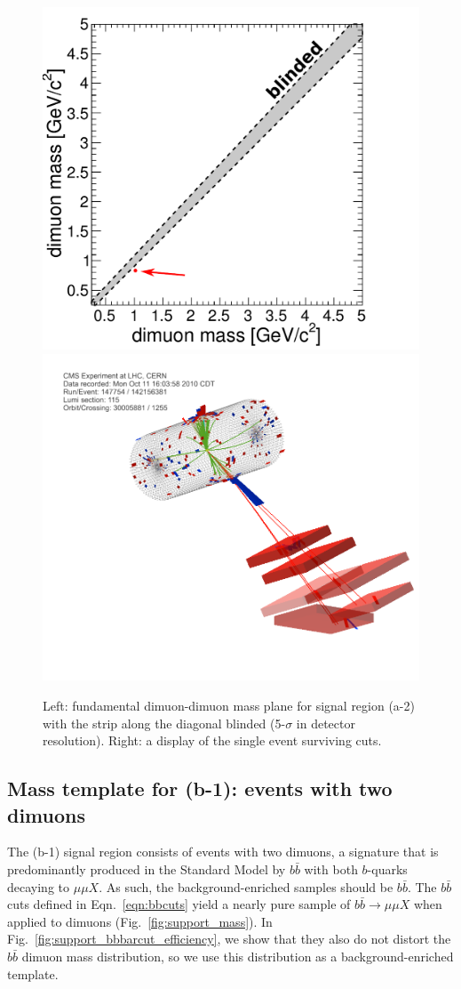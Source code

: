 \documentclass[12pt]{cms-tdr}
\begin{document}
\begin{figure}
\begin{center}
\includegraphics[height=6.5 cm]{PLOTS/data_quadmu_wholecontrol.pdf} \hspace{0.5 cm}
\includegraphics[height=6.5 cm]{PLOTS/quadmu_control_eventdisplay.png}
\end{center}

\caption{Left: fundamental dimuon-dimuon mass plane for signal region
  (a-2) with the strip along the diagonal blinded (5-$\sigma$ in
  detector resolution).  Right: a display of the single event
  surviving cuts. \label{fig:quadmu_wholecontrol}}
\end{figure}

\subsection{Mass template for (b-1): events with two dimuons}

The (b-1) signal region consists of events with two dimuons, a
signature that is predominantly produced in the Standard Model by
$b\bar{b}$ with both $b$-quarks decaying to $\mu\mu X$.  As such, the
background-enriched samples should be $b\bar{b}$.  The $b\bar{b}$ cuts
defined in Eqn.~\ref{eqn:bbcuts} yield a nearly pure sample of
$b\bar{b} \to \mu\mu X$ when applied to dimuons
(Fig.~\ref{fig:support_mass}).  In
Fig.~\ref{fig:support_bbbarcut_efficiency}, we show that they also do
not distort the $b\bar{b}$ dimuon mass distribution, so we use
this distribution as a background-enriched template.
\end{document}
